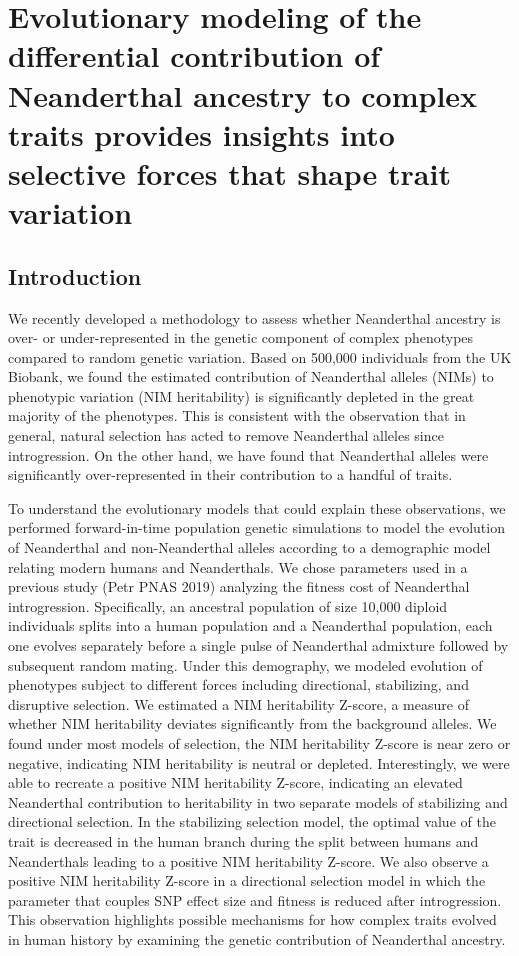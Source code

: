 \chapter{Evolutionary modeling of the differential contribution of Neanderthal ancestry to complex traits provides insights into selective forces that shape trait variation}
\section{Introduction}
We recently developed a methodology to assess whether Neanderthal ancestry is over- or under-represented in the genetic component of complex phenotypes compared to random genetic variation. Based on 500,000 individuals from the UK Biobank, we found the estimated contribution of Neanderthal alleles (NIMs) to phenotypic variation (NIM heritability) is significantly depleted in the great majority of the phenotypes. This is consistent with the observation that in general, natural selection has acted to remove Neanderthal alleles since introgression. On the other hand, we have found that Neanderthal alleles were significantly over-represented in their contribution to a handful of traits.

To understand the evolutionary models that could explain these observations, we performed forward-in-time population genetic simulations to model the evolution of Neanderthal and non-Neanderthal alleles according to a demographic model relating modern humans and Neanderthals. We chose parameters used in a previous study (Petr PNAS 2019) analyzing the fitness cost of Neanderthal introgression. Specifically, an ancestral population of size 10,000 diploid individuals splits into a human population and a Neanderthal population, each one evolves separately before a single pulse of Neanderthal admixture followed by subsequent random mating. Under this demography, we modeled evolution of phenotypes subject to different forces including directional, stabilizing, and disruptive selection. We estimated a NIM heritability Z-score, a measure of whether NIM heritability deviates significantly from the background alleles. We found under most models of selection, the NIM heritability Z-score is near zero or negative, indicating NIM heritability is neutral or depleted. Interestingly, we were able to recreate a positive NIM heritability Z-score, indicating an elevated Neanderthal contribution to heritability in two separate models of stabilizing and directional selection. In the stabilizing selection model, the optimal value of the trait is decreased in the human branch during the split between humans and Neanderthals leading to a positive NIM heritability Z-score. We also observe a positive NIM heritability Z-score in a directional selection model in which the parameter that couples SNP effect size and fitness is reduced after introgression. This observation highlights possible mechanisms for how complex traits evolved in human history by examining the genetic contribution of Neanderthal ancestry.
